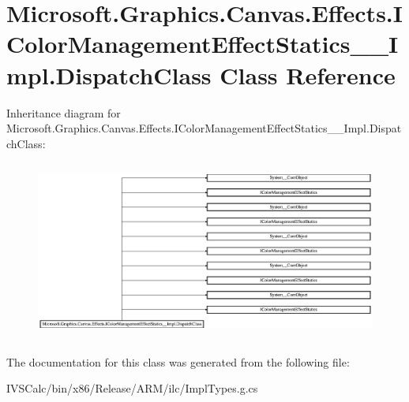 \hypertarget{class_microsoft_1_1_graphics_1_1_canvas_1_1_effects_1_1_i_color_management_effect_statics_____impl_1_1_dispatch_class}{}\section{Microsoft.\+Graphics.\+Canvas.\+Effects.\+I\+Color\+Management\+Effect\+Statics\+\_\+\+\_\+\+Impl.\+Dispatch\+Class Class Reference}
\label{class_microsoft_1_1_graphics_1_1_canvas_1_1_effects_1_1_i_color_management_effect_statics_____impl_1_1_dispatch_class}
Inheritance diagram for Microsoft.\+Graphics.\+Canvas.\+Effects.\+I\+Color\+Management\+Effect\+Statics\+\_\+\+\_\+\+Impl.\+Dispatch\+Class\+:\begin{figure}[H]
\begin{center}
\leavevmode
\includegraphics[height=5.945946cm]{class_microsoft_1_1_graphics_1_1_canvas_1_1_effects_1_1_i_color_management_effect_statics_____impl_1_1_dispatch_class}
\end{center}
\end{figure}


The documentation for this class was generated from the following file\+:\begin{DoxyCompactItemize}
\item 
I\+V\+S\+Calc/bin/x86/\+Release/\+A\+R\+M/ilc/Impl\+Types.\+g.\+cs\end{DoxyCompactItemize}
